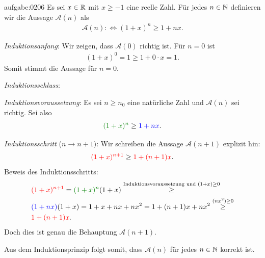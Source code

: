 \begin{antwort}{aufgabe:0206}
Es sei $x\in\mathbb{R}$ mit $x\geq -1$ eine reelle Zahl. Für jedes $n\in\mathbb{N}$ definieren wir die Aussage $\mathcal{A}(n)$ als
\begin{align*}
    \mathcal{A}(n) :\iff (1+x)^n\geq 1+nx.
\end{align*}
\begin{aenum}
    \item \textit{Induktionsanfang}: Wir zeigen, dass $\mathcal{A}(0)$ richtig ist. Für $n=0$ ist
    \begin{align*}
        (1+x)^0 = 1 \geq 1 + 0\cdot x = 1.
    \end{align*}
    Somit stimmt die Aussage für $n=0$.
    \item \textit{Induktionsschluss}:
        \begin{renum}
            \item \textit{Induktionsvoraussetzung}: Es sei $n\geq n_0$ eine natürliche Zahl und $\mathcal{A}(n)$ sei richtig. Sei also
            \begin{align*}
                \textcolor{Green}{(1+x)^n} \geq \textcolor{Blue}{1+nx}.
            \end{align*}
            \item \textit{Induktionsschritt} ($n\to n+1)$: Wir schreiben die Aussage $\mathcal{A}(n+1)$ explizit hin:
            \begin{align*}
                \textcolor{Red}{(1+x)^{n+1}} \geq \textcolor{Red}{1 + (n+1)x}.
            \end{align*}
            Beweis des Induktionsschritts:
            \begin{align*}
                &\textcolor{Red}{(1+x)^{n+1}} = \textcolor{Green}{(1+x)^n} (1+x) \stackrel{\text{Induktionsvoraussetzung und }(1+x)\geq 0}{\geq}\\
                &\textcolor{Blue}{(1+nx)}(1+x) = 1+x+nx+nx^2 = 1+(n+1)x + nx^2 \stackrel{(nx^2)\geq 0}{\geq}\\
                &\textcolor{Red}{1 + (n+1)x}.
            \end{align*}
        Doch dies ist genau die Behauptung $\mathcal{A}(n+1)$.
        \end{renum}
\end{aenum}
Aus dem Induktionsprinzip folgt somit, dass $\mathcal{A}(n)$ für jedes $n\in\mathbb{N}$ korrekt ist.
\end{antwort}

